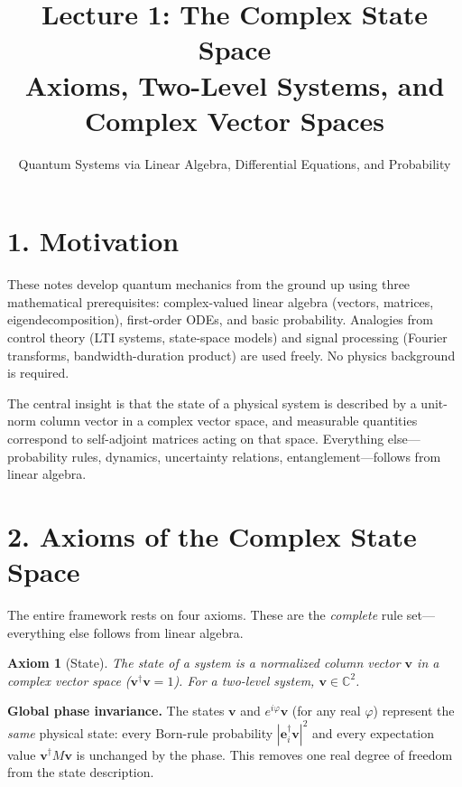 \documentclass[12pt,a4paper]{article}
\title{\textbf{Lecture 1: The Complex State Space} \\ \large Axioms, Two-Level Systems, and Complex Vector Spaces}
\author{Quantum Systems via Linear Algebra, Differential Equations, and Probability}
\date{}
\newtheorem{axiom}{Axiom}
\begin{document}
\maketitle
\thispagestyle{fancy}

\section{1. Motivation}

These notes develop quantum mechanics from the ground up using three mathematical prerequisites: complex-valued linear algebra (vectors, matrices, eigendecomposition), first-order ODEs, and basic probability.  Analogies from control theory (LTI systems, state-space models) and signal processing (Fourier transforms, bandwidth-duration product) are used freely.  No physics background is required.

The central insight is that the state of a physical system is described by a unit-norm column vector in a complex vector space, and measurable quantities correspond to self-adjoint matrices acting on that space.  Everything else---probability rules, dynamics, uncertainty relations, entanglement---follows from linear algebra.

\section{2. Axioms of the Complex State Space}

The entire framework rests on four axioms.  These are the \emph{complete} rule set---everything else follows from linear algebra.

\begin{axiom}[State]
The state of a system is a normalized column vector $\mathbf{v}$ in a complex vector space ($\mathbf{v}^\dagger\mathbf{v} = 1$).  For a two-level system, $\mathbf{v} \in \mathbb{C}^2$.
\end{axiom}

\medskip
\noindent\textbf{Global phase invariance.}  The states $\mathbf{v}$ and $e^{i\varphi}\mathbf{v}$ (for any real $\varphi$) represent the \emph{same} physical state: every Born-rule probability $|\mathbf{e}_i^\dagger\mathbf{v}|^2$ and every expectation value $\mathbf{v}^\dagger M\mathbf{v}$ is unchanged by the phase.  This removes one real degree of freedom from the state description.
\end{document}

